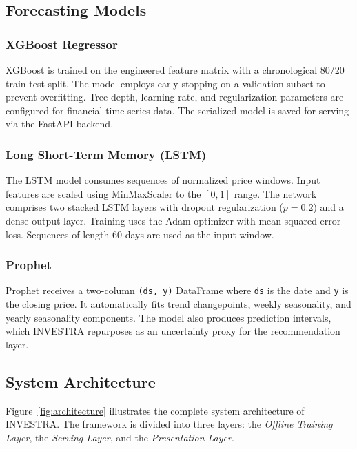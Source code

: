\documentclass[journal,comsoc]{IEEEtran}
\begin{document}
\subsection{Forecasting Models}

\subsubsection{XGBoost Regressor}
XGBoost \cite{patel2022encoding} is trained on the engineered feature matrix with a chronological 80/20 train-test split. The model employs early stopping on a validation subset to prevent overfitting. Tree depth, learning rate, and regularization parameters are configured for financial time-series data. The serialized model is saved for serving via the FastAPI backend.

\subsubsection{Long Short-Term Memory (LSTM)}
The LSTM model \cite{graves2012long} consumes sequences of normalized price windows. Input features are scaled using MinMaxScaler to the $[0,1]$ range. The network comprises two stacked LSTM layers with dropout regularization ($p = 0.2$) and a dense output layer. Training uses the Adam optimizer with mean squared error loss. Sequences of length 60 days are used as the input window.

\subsubsection{Prophet}
Prophet receives a two-column \texttt{(ds, y)} DataFrame where \texttt{ds} is the date and \texttt{y} is the closing price. It automatically fits trend changepoints, weekly seasonality, and yearly seasonality components. The model also produces prediction intervals, which INVESTRA repurposes as an uncertainty proxy for the recommendation layer.

\subsection{System Architecture}

Figure~\ref{fig:architecture} illustrates the complete system architecture of INVESTRA. The framework is divided into three layers: the \textit{Offline Training Layer}, the \textit{Serving Layer}, and the \textit{Presentation Layer}.
\end{document}
